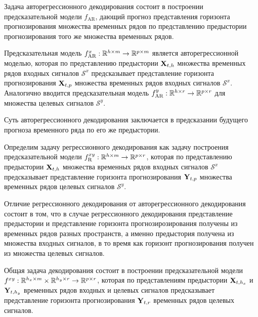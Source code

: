Задача авторегрессионного декодирования состоит в построении предсказательной модели $f_{\text{AR}}$, дающий прогноз представления горизонта прогнозирования множества временных рядов по представлению предыстории прогнозирования того же множества временных рядов.

\begin{definition}
	Предсказательная модель $f_{\text{AR}}^x: \mathbb{R}^{h \times m} \rightarrow \mathbb{R}^{p \times m}$ является авторегрессионной моделью, которая по представлению предыстории $\mathbf{X}_{t,h}$ множества временных рядов входных сигналов $\mathcal{S}^x$ предсказывает представление горизонта прогнозирования $\mathbf{X}_{t,p}$ множества временных рядов входных сигналов $\mathcal{S}^x$.
	Аналогично вводится предсказательная модель $f_{\text{AR}}^y: \mathbb{R}^{h \times r} \rightarrow \mathbb{R}^{p \times r}$ для множества целевых сигналов $\mathcal{S}^y$.
\end{definition}
Суть авторегрессионного декодирования заключается в предсказании будущего прогноза временного ряда по его же предыстории.

\begin{definition}
	Определим задачу регрессионного декодирования как задачу построения предсказательной модели $f_{\text{R}}^{xy}: \mathbb{R}^{h \times m} \rightarrow \mathbb{R}^{p \times r}$, которая по представлению предыстории $\mathbf{X}_{t,h}$ множества временных рядов входных сигналов $\mathcal{S}^x$ предсказывает представление горизонта прогнозирования $\mathbf{Y}_{t,p}$ множества временных рядов целевых сигналов $\mathcal{S}^y$.
\end{definition}

Отличие регрессионного декодирования от авторегрессионного декодирования состоит в том, что в случае регрессионного декодирования представление предыстории и представление горизонта прогнозирозирования получены из временных рядов разных пространств, а именно предыстория получена из множества входных сигналов, в то время как горизонт прогнозирования получен из множества целевых сигналов.

\begin{definition}
	Общая задача декодирования состоит в построении предсказательной модели $f^{xy}: \mathbb{R}^{h_x \times m} \times \mathbb{R}^{h_y \times r} \rightarrow \mathbb{R}^{p \times r}$, которая по представлениям предыстории $\mathbf{X}_{t,h_x}$ и $\mathbf{Y}_{t,h_y}$ временных рядов входных и целевых сигналов предсказывает представление горизонта прогнозирования $\mathbf{Y}_{t,r}$ временных рядов целевых сигналов. 
\end{definition}

